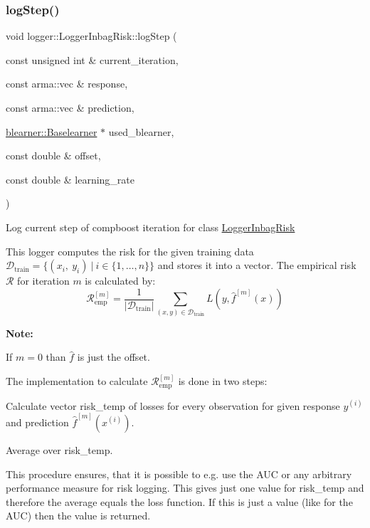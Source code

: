 \subsubsection{\texorpdfstring{log\+Step()}{logStep()}}
{\footnotesize\ttfamily void logger\+::\+Logger\+Inbag\+Risk\+::log\+Step (\begin{DoxyParamCaption}\item[{const unsigned int \&}]{current\+\_\+iteration,  }\item[{const arma\+::vec \&}]{response,  }\item[{const arma\+::vec \&}]{prediction,  }\item[{\mbox{\hyperlink{classblearner_1_1_baselearner}{blearner\+::\+Baselearner}} $\ast$}]{used\+\_\+blearner,  }\item[{const double \&}]{offset,  }\item[{const double \&}]{learning\+\_\+rate }\end{DoxyParamCaption})\hspace{0.3cm}{\ttfamily [virtual]}}



Log current step of compboost iteration for class {\ttfamily \mbox{\hyperlink{classlogger_1_1_logger_inbag_risk}{Logger\+Inbag\+Risk}}} 

This logger computes the risk for the given training data $\mathcal{D}_\mathrm{train} = \{(x_i,\ y_i)\ |\ i \in \{1, \dots, n\}\}$ and stores it into a vector. The empirical risk $\mathcal{R}$ for iteration $m$ is calculated by\+: \[ \mathcal{R}_\mathrm{emp}^{[m]} = \frac{1}{|\mathcal{D}_\mathrm{train}|}\sum\limits_{(x,y) \in \mathcal{D}_\mathrm{train}} L(y, \hat{f}^{[m]}(x)) \]

{\bfseries Note\+:}
\begin{DoxyItemize}
\item If $m=0$ than $\hat{f}$ is just the offset.
\item The implementation to calculate $\mathcal{R}_\mathrm{emp}^{[m]}$ is done in two steps\+:
\begin{DoxyEnumerate}
\item Calculate vector {\ttfamily risk\+\_\+temp} of losses for every observation for given response $y^{(i)}$ and prediction $\hat{f}^{[m]}(x^{(i)})$.
\item Average over {\ttfamily risk\+\_\+temp}.
\end{DoxyEnumerate}

This procedure ensures, that it is possible to e.\+g. use the A\+UC or any arbitrary performance measure for risk logging. This gives just one value for {\ttfamily risk\+\_\+temp} and therefore the average equals the loss function. If this is just a value (like for the A\+UC) then the value is returned.
\end{DoxyItemize}


